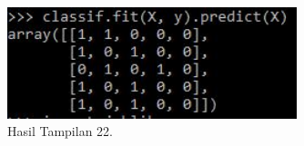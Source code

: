\begin{figure}[ht]\centerline{\includegraphics[width=0.75\textwidth]{figures/huda/31.JPG}}\caption{Hasil Tampilan 22.}\end{figure}

